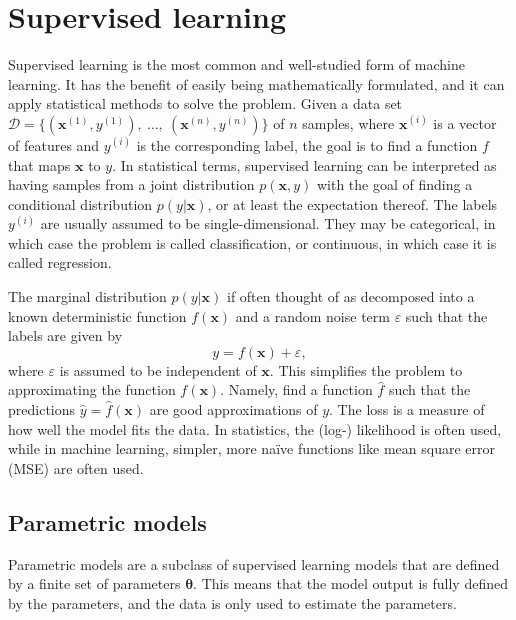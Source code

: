 

\section{Supervised learning}
Supervised learning is the most common and well-studied form of machine learning.
It has the benefit of easily being mathematically formulated, and it can apply statistical methods to solve the problem.
Given a data set
$
    \mathcal{D} = \{
    (\bm{x}^{(1)}, y^{(1)}), \
    \dots, \
    (\bm{x}^{(n)}, y^{(n)})
    \}
$
of $n$ samples, where $\bm{x}^{(i)}$ is a vector of features and $y^{(i)}$ is the corresponding label, the goal is to find a function $f$ that maps $\bm{x}$ to $y$.
In statistical terms, supervised learning can be interpreted as having samples from a joint distribution $p(\bm{x}, y)$ with the goal of finding a conditional distribution $p(y|\bm{x})$, or at least the expectation thereof.
The labels $y^{(i)}$ are usually assumed to be single-dimensional.
They may be categorical, in which case the problem is called classification, or continuous, in which case it is called regression.

The marginal distribution $p(y|\bm{x})$ if often thought of as decomposed into a known deterministic function $f(\bm{x})$ and a random noise term $\varepsilon$ such that the labels are given by
\begin{equation}
    y = f(\bm{x}) + \varepsilon,
    \label{eq:ml_model}
\end{equation}
where $\varepsilon$ is assumed to be independent of $\bm{x}$.
This simplifies the problem to approximating the function $f(\bm{x})$.
Namely, find a function $\hat{f}$ such that the predictions $\hat{y}=\hat{f}(\bm{x})$ are good approximations of $y$.
The loss is a measure of how well the model fits the data.
In statistics, the (log-) likelihood is often used, while in machine learning, simpler, more naïve functions like mean square error (MSE) are often used.


\subsection{Parametric models}
Parametric models are a subclass of supervised learning models that are defined by a finite set of parameters $\bm{\theta}$.
This means that the model output is fully defined by the parameters, and the data is only used to estimate the parameters.

